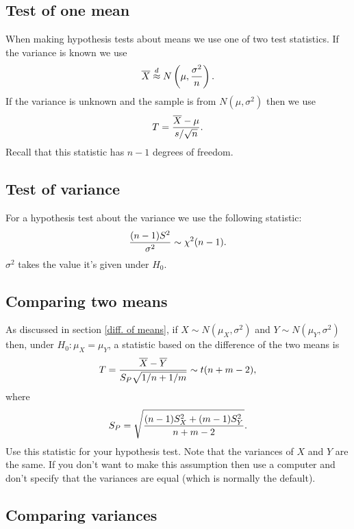 \documentclass[10pt, two column]{article}
\begin{document}
\subsection{Test of one mean}

When making hypothesis tests about means we use one of two test statistics. If the variance is known we use \vspace{-6pt}
\[
\overline{X} \stackrel{d}{\approx} N \left( \mu, \frac{\sigma^{2}}{n} \right). \vspace{-6pt}
\]
If the variance is unknown and the sample is from $N(\mu, \sigma^{2})$ then we use
\[
T = \frac{\overline{X} - \mu}{s / \sqrt{n}}. \vspace{-6pt}
\]
Recall that this statistic has $n-1$ degrees of freedom.

\subsection{Test of variance}

For a hypothesis test about the variance we use the following statistic: 
\[
\frac{(n-1)S^{2}}{\sigma^{2}} \sim \chi^{2}(n-1). \vspace{-6pt}
\]
$\sigma^{2}$ takes the value it's given under $H_{0}$. 

\subsection{Comparing two means}

As discussed in section \ref{diff. of means}, if $X \sim N(\mu_{X}, \sigma^{2})$ and $Y \sim N(\mu_{Y}, \sigma^{2})$ then, under $H_{0} : \mu_{X} = \mu_{Y}$, a statistic based on the difference of the two means is \vspace{-6pt}
\[
T = \frac{\overline{X} - \overline{Y}}{S_{P} \sqrt{1/n + 1/m}} \sim t(n+m-2), \vspace{-6pt}
\]
where
\[
S_{P} = \sqrt{\frac{(n-1)S_{X}^{2} + (m-1)S_{Y}^{2}}{n+m-2}}. \vspace{-6pt}
\]
Use this statistic for your hypothesis test. Note that the variances of $X$ and $Y$ are the same. If you don't want to make this assumption then use a computer and don't specify that the variances are equal (which is normally the default). 

\subsection{Comparing variances}
\end{document}
